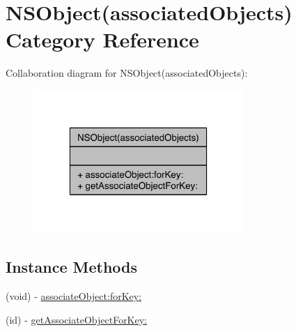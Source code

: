 \hypertarget{category_n_s_object_07associated_objects_08}{\section{N\-S\-Object(associated\-Objects) Category Reference}
\label{category_n_s_object_07associated_objects_08}
}


Collaboration diagram for N\-S\-Object(associated\-Objects)\-:
\nopagebreak
\begin{figure}[H]
\begin{center}
\leavevmode
\includegraphics[width=226pt]{category_n_s_object_07associated_objects_08__coll__graph}
\end{center}
\end{figure}
\subsection*{Instance Methods}
\begin{DoxyCompactItemize}
\item 
(void) -\/ \hyperlink{category_n_s_object_07associated_objects_08_a8e38589ddb87bb76777168b95a2c51a7}{associate\-Object\-:for\-Key\-:}
\item 
(id) -\/ \hyperlink{category_n_s_object_07associated_objects_08_a7f725824fa22e233bced36d0c26d7eb1}{get\-Associate\-Object\-For\-Key\-:}
\end{DoxyCompactItemize}


